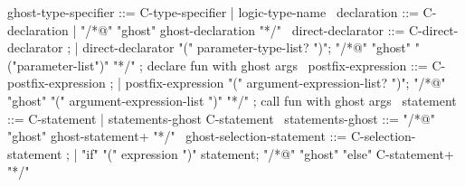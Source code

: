 \begin{syntax}

  ghost-type-specifier ::= C-type-specifier | {logic-type-name} \
  declaration ::= C-declaration | "/*@" "ghost" ghost-declaration "*/" \
  direct-declarator ::= C-direct-declarator ;
    | direct-declarator "(" parameter-type-list? ")";
        {"/*@" "ghost" "("parameter-list")" "*/"} ; declare fun with ghost args
        \
  postfix-expression ::= C-postfix-expression ;
    | postfix-expression "(" argument-expression-list? ")";
    {"/*@" "ghost" "(" argument-expression-list ")" "*/"} ; call fun with ghost args
    \
  statement ::= C-statement | statements-ghost C-statement \
  statements-ghost ::= "/*@" "ghost" ghost-statement+ "*/" \
  ghost-selection-statement ::= C-selection-statement ;
    | "if" "(" expression ")" statement;
      {"/*@" "ghost" "else" C-statement+ "*/"} \

\end{syntax}

